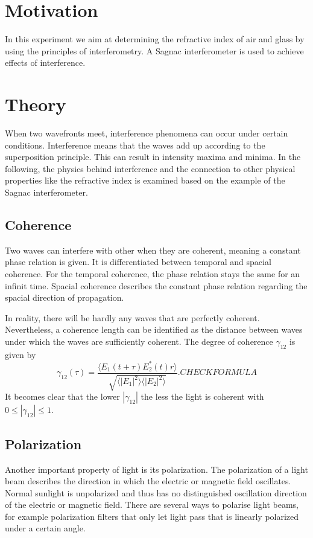 \section{Motivation}
\label{sec:Motivation}
In this experiment we aim at determining the refractive index of air and glass by using the principles of interferometry. A Sagnac interferometer is used to achieve
effects of interference.

\section{Theory}
\label{sec:Theory}
When two wavefronts meet, interference phenomena can occur under certain conditions. Interference means that the waves add up according to the superposition principle. This can result in
intensity maxima and minima.
In the following, the physics behind interference and the connection to other physical properties like the refractive index is examined based on the example of the Sagnac interferometer.

\subsection{Coherence}
\label{sec:Coherence}
Two waves can interfere with other when they are coherent, meaning a constant phase relation is given. It is differentiated between temporal and spacial coherence. For the temporal
coherence, the phase relation stays the same for an infinit time. Spacial coherence describes the constant phase relation regarding the spacial direction of propagation.

In reality, there will be hardly any waves that are perfectly coherent. Nevertheless, a coherence length can be identified as the distance between waves under which the waves are sufficiently
coherent. The degree of coherence $\gamma_{12}$ is given by
\begin{equation*}
    \gamma_{12}(\tau)= \frac{\langle E_1(t+\tau)E^{*}_2(t) r \rangle}{\sqrt{\langle|E_1|^2\rangle\langle|E_2|^2\rangle}}. CHECK FORMULA
\end{equation*}
It becomes clear that the lower $|\gamma_{12}|$ the less the light is coherent with $0≤|\gamma_{12}|≤1$.

\subsection{Polarization}
\label{sec:Polarization}
Another important property of light is its polarization. The polarization of a light beam describes the direction in which the electric or magnetic field oscillates. Normal sunlight 
is unpolarized and thus has no distinguished oscillation direction of the electric or magnetic field. There are several ways to polarise light beams, for example polarization filters that only
let light pass that is linearly polarized under a certain angle.

